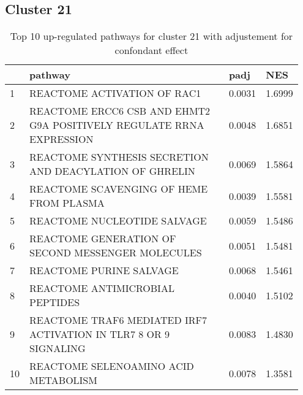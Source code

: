 \documentclass{article}
\begin{document}
\subsection{Cluster 21 }
\begin{table}[H]
\centering
\begin{tabular}{p{0.05\linewidth}p{0.7\linewidth}p{0.1\linewidth}p{0.1\linewidth}}
  \hline
 & pathway & padj & NES \\ 
  \hline
1 & REACTOME ACTIVATION OF RAC1 & 0.0031 & 1.6999 \\ 
  2 & REACTOME ERCC6 CSB AND EHMT2 G9A POSITIVELY REGULATE RRNA EXPRESSION & 0.0048 & 1.6851 \\ 
  3 & REACTOME SYNTHESIS SECRETION AND DEACYLATION OF GHRELIN & 0.0069 & 1.5864 \\ 
  4 & REACTOME SCAVENGING OF HEME FROM PLASMA & 0.0039 & 1.5581 \\ 
  5 & REACTOME NUCLEOTIDE SALVAGE & 0.0059 & 1.5486 \\ 
  6 & REACTOME GENERATION OF SECOND MESSENGER MOLECULES & 0.0051 & 1.5481 \\ 
  7 & REACTOME PURINE SALVAGE & 0.0068 & 1.5461 \\ 
  8 & REACTOME ANTIMICROBIAL PEPTIDES & 0.0040 & 1.5102 \\ 
  9 & REACTOME TRAF6 MEDIATED IRF7 ACTIVATION IN TLR7 8 OR 9 SIGNALING & 0.0083 & 1.4830 \\ 
  10 & REACTOME SELENOAMINO ACID METABOLISM & 0.0078 & 1.3581 \\ 
   \hline
\end{tabular}
\caption{Top 10 up-regulated pathways for cluster 21 with adjustement for confondant effect} 
\label{tab:q3_2_conf_21}
\end{table}
\end{document}
